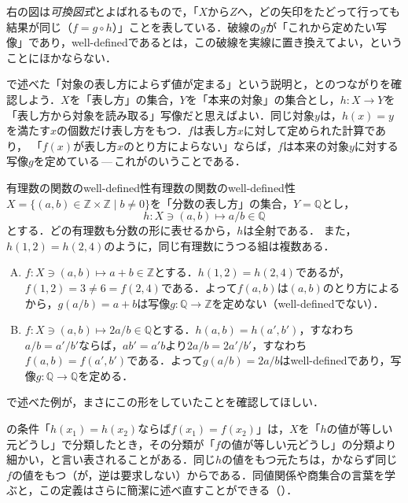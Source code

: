 右の図は\emph{可換図式}とよばれるもので，「$X$から$Z$へ，どの矢印をたどって行っても結果が同じ（$f = g \circ h$）」ことを表している．破線の$g$が「これから定めたい写像」であり，well-definedであるとは，この破線を実線に置き換えてよい，ということにほかならない．

\begin{remark}
  で述べた「対象の表し方によらず値が定まる」という説明と，とのつながりを確認しよう．$X$を「表し方」の集合，$Y$を「本来の対象」の集合とし，$h \colon X \to Y$を「表し方から対象を読み取る」写像だと思えばよい．同じ対象$y$は，$h(x) = y$を満たす$x$の個数だけ表し方をもつ．$f$は表し方$x$に対して定められた計算であり，
  「$f(x)$が表し方$x$のとり方によらない」ならば，$f$は本来の対象$y$に対する写像$g$を定めている\,---\,これがのいうことである．
\end{remark}

\begin{example}{有理数の関数のwell-defined性}{有理数の関数のwell-defined性}
  $X = \{ (a, b) \in \mathbb{Z} \times \mathbb{Z} \mid b \ne 0 \}$を「分数の表し方」の集合，$Y = \mathbb{Q}$とし，
  \[
    h \colon X \ni (a, b) \mapsto a/b \in \mathbb{Q}
  \]
  とする．どの有理数も分数の形に表せるから，$h$は全射である．
  また，$h(1, 2) = h(2, 4)$のように，同じ有理数にうつる組は複数ある．
  \begin{enumerate}[(A)]
    \item $f \colon X \ni (a, b) \mapsto a + b \in \mathbb{Z}$とする．$h(1, 2) = h(2, 4)$であるが，$f(1, 2) = 3 \ne 6 = f(2, 4)$である．よって$f(a, b)$は$(a, b)$のとり方によるから，$g(a/b) = a + b$は写像$g \colon \mathbb{Q} \to \mathbb{Z}$を定めない（well-definedでない）．
    \item $f \colon X \ni (a, b) \mapsto 2a/b \in \mathbb{Q}$とする．$h(a, b) = h(a', b')$，すなわち$a/b = a'/b'$ならば，$ab' = a'b$より$2a/b = 2a'/b'$，すなわち$f(a, b) = f(a', b')$である．よって$g (a/b ) = 2a/b$はwell-definedであり，写像$g \colon \mathbb{Q} \to \mathbb{Q}$を定める．
  \end{enumerate}
  で述べた例が，まさにこの形をしていたことを確認してほしい．
\end{example}

\begin{remark}
  の条件「$h(x_1) = h(x_2)$ならば$f(x_1) = f(x_2)$」は，$X$を「$h$の値が等しい元どうし」で分類したとき，その分類が「$f$の値が等しい元どうし」の分類より細かい，と言い表されることがある．同じ$h$の値をもつ元たちは，かならず同じ$f$の値をもつ（が，逆は要求しない）からである．同値関係や商集合の言葉を学ぶと，この定義はさらに簡潔に述べ直すことができる（）．
\end{remark}
